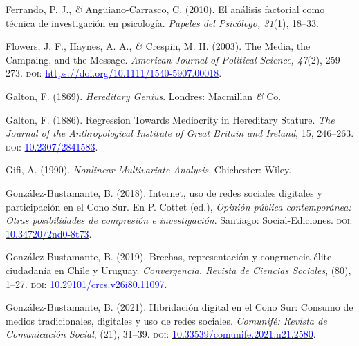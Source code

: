 \documentclass[a4paper]{tufte-handout}
\begin{document}
\begin{list}{}
\item{\small Ferrando, P. J., {\itshape \&} Anguiano-Carrasco, C. (2010). El análisis factorial como técnica de investigación en psicología. {\itshape Papeles del Psicólogo, 31}(1), 18--33.}

\item{\small Flowers, J. F., Haynes, A. A., {\itshape \&} Crespin, M. H. (2003). The Media, the Campaing, and the Message. {\itshape American Journal of Political Science, 47}(2), 259--273. {\scshape doi:} \href{https://doi.org/10.1111/1540-5907.00018}{\textcolor{blue}{https://doi.org/10.1111/1540-5907.00018}}.}

\item{\small Galton, F. (1869). {\itshape Hereditary Genius}. Londres: Macmillan {\itshape \&} Co.}

\item{\small Galton, F. (1886). Regression Towards Mediocrity in Hereditary Stature. {\itshape The Journal of the Anthropological Institute of Great Britain and Ireland}, 15, 246--263. {\scshape doi:} \href{https://doi.org/10.2307/2841583}{\textcolor{blue}{10.2307/2841583}}.}

\item{\small Gifi, A. (1990). {\itshape Nonlinear Multivariate Analysis}. Chichester: Wiley.}

\item{\small González-Bustamante, B. (2018). Internet, uso de redes sociales digitales y participación en el Cono Sur. En P. Cottet (ed.), {\itshape Opinión pública contemporánea: Otras posibilidades de compresión e investigación}. Santiago: Social-Ediciones. {\scshape doi:} \href{https://doi.org/10.34720/2nd0-8t73}{\textcolor{blue}{10.34720/2nd0-8t73}}.}

\item{\small González-Bustamante, B. (2019). Brechas, representación y congruencia élite-ciudadanía en Chile y Uruguay. {\itshape Convergencia. Revista de Ciencias Sociales}, (80), 1--27. {\scshape doi:} \href{https://doi.org/10.29101/crcs.v26i80.11097}{\textcolor{blue}{10.29101/crcs.v26i80.11097}}.}

\item{\small González-Bustamante, B. (2021). Hibridación digital en el Cono Sur: Consumo de medios tradicionales, digitales y uso de redes sociales. {\itshape Comunifé: Revista de Comunicación Social}, (21), 31--39. {\scshape doi:} \href{https://doi.org/10.33539/comunife.2021.n21.2580}{\textcolor{blue}{10.33539/comunife.2021.n21.2580}}.}


\end{list}
\end{document}
